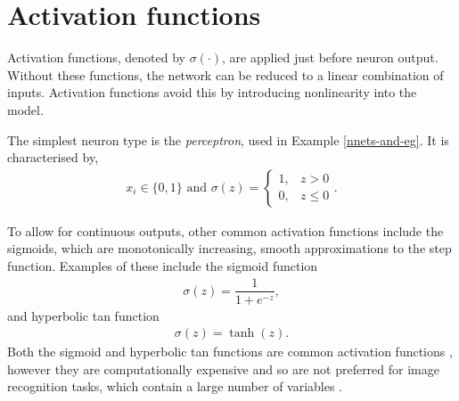 \section{Activation functions}\label{nnets-act}

Activation functions, denoted by $\sigma(\cdot)$, are applied just before neuron output. Without these functions, the network can be reduced to a linear combination of inputs. Activation functions avoid this by introducing nonlinearity into the model.

The simplest neuron type is the \textit{perceptron}, used in Example \ref{nnets-and-eg}. It is characterised by,
\begin{align*}
	x_i \in \{0,1\} \text{ and } \sigma(z) = \begin{cases}
		1, & z > 0 \\
		0, & z \le 0
	\end{cases}.
\end{align*}

To allow for continuous outputs, other common activation functions include the sigmoids, which are monotonically increasing, smooth approximations to the step function. Examples of these include the sigmoid function
\begin{align*}
	\sigma(z) = \dfrac{1}{1+e^{-z}},
\end{align*}
and hyperbolic tan function
\begin{align*}
	\sigma(z) = \tanh(z).
\end{align*}
Both the sigmoid and hyperbolic tan functions are common activation functions \citep{Goodfellow-et-al-2016}, however they are computationally expensive and so are not preferred for image recognition tasks, which contain a large number of variables \citep{LeCun2012, Nielson2015}.

